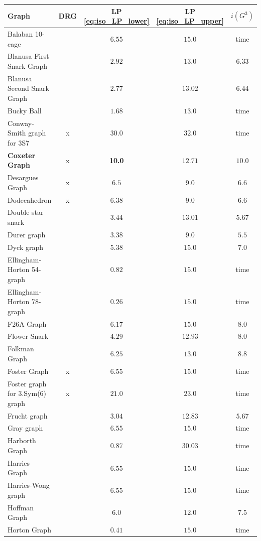 \documentclass[a4paper,11pt]{article}
\theoremstyle{definition}
\begin{document}
\begin{table}[H]
    \centering
       \begin{tabular}{l|c|cc|c}
    Graph & DRG & LP \eqref{eq:iso_LP_lower} & LP \eqref{eq:iso_LP_upper} & $i(G^3)$ \\
    \hline
    Balaban 10-cage &  & $6.55$ & $15.0$ & time \\
    Blanusa First Snark Graph &  & $2.92$ & $13.0$ & $6.33$ \\
    Blanusa Second Snark Graph &  & $2.77$ & $13.02$ & $6.44$ \\
    Bucky Ball &  & $1.68$ & $13.0$ & time \\
    Conway-Smith graph for 3S7 & x & $30.0$ & $32.0$ & time \\
    \textbf{Coxeter Graph} & x & \textbf{10.0} & $12.71$ & $10.0$ \\
    Desargues Graph & x & $6.5$ & $9.0$ & $6.6$ \\
    Dodecahedron & x & $6.38$ & $9.0$ & $6.6$ \\
    Double star snark &  & $3.44$ & $13.01$ & $5.67$ \\
    Durer graph &  & $3.38$ & $9.0$ & $5.5$ \\
    Dyck graph &  & $5.38$ & $15.0$ & $7.0$ \\
    Ellingham-Horton 54-graph &  & $0.82$ & $15.0$ & time \\
    Ellingham-Horton 78-graph &  & $0.26$ & $15.0$ & time \\
    F26A Graph &  & $6.17$ & $15.0$ & $8.0$ \\
    Flower Snark &  & $4.29$ & $12.93$ & $8.0$ \\
    Folkman Graph &  & $6.25$ & $13.0$ & $8.8$ \\
    Foster Graph & x & $6.55$ & $15.0$ & time \\
    Foster graph for 3.Sym(6) graph & x & $21.0$ & $23.0$ & time \\
    Frucht graph &  & $3.04$ & $12.83$ & $5.67$ \\
    Gray graph &  & $6.55$ & $15.0$ & time \\
    Harborth Graph &  & $0.87$ & $30.03$ & time \\
    Harries Graph &  & $6.55$ & $15.0$ & time \\
    Harries-Wong graph &  & $6.55$ & $15.0$ & time \\
    Hoffman Graph &  & $6.0$ & $12.0$ & $7.5$ \\
    Horton Graph &  & $0.41$ & $15.0$ & time \\

\end{tabular}
\end{table}
\end{document}
